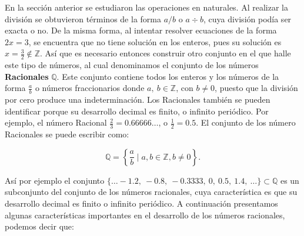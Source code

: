 En la sección anterior se estudiaron las operaciones en naturales. Al realizar la división se obtuvieron términos de la forma $a/b$ o $a\div b$, cuya división podía ser exacta o no. De la misma forma, al intentar resolver ecuaciones de la forma $2x=3$, se encuentra que no tiene solución en los enteros, pues su solución es $x=\frac{3}{2}\notin\mathbb{Z}$. Así que es necesario entonces construir otro conjunto en el que halle este tipo de números, al cual denominamos el conjunto de los números \textbf{Racionales} $\mathbb{Q}$. Este conjunto contiene todos los enteros y los números de la forma $\frac{a}{b}$ o números fraccionarios donde $a,\ b\in\mathbb{Z}$, con $b\neq 0$, puesto que la división por cero produce una indeterminación. Los Racionales también se pueden identificar porque su desarrollo decimal es finito, o infinito periódico. Por ejemplo, el número Racional $\frac{2}{3}=0.66666\dots$, o $\frac{1}{2}=0.5$. El conjunto de los número Racionales se puede escribir como:

\begin{equation}
\mathbb{Q}=\left\{\frac{a}{b} \mid a,b\in\mathbb{Z}, b\neq 0\right\}.
\end{equation}

Así por ejemplo el conjunto $\{\dots -1.2,\ -0.8,\ -0.3333,\ 0,\ 0.5,\ 1.4,\ \dots\}\subset\mathbb{Q}$ es un subconjunto del conjunto de los números racionales, cuya característica es que su desarrollo decimal es finito o infinito periódico. A continuación presentamos algunas características importantes en el desarrollo de los números racionales, podemos decir que:

